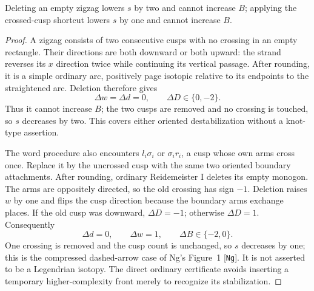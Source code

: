 \begin{lemma}
\label{ng:deletions}\leanok
Deleting an empty zigzag lowers $s$ by two and cannot increase $B$; applying
the crossed-cusp shortcut lowers $s$ by one and cannot increase $B$.

\end{lemma}
\begin{proof}\leanok
A zigzag consists of two consecutive cusps with no crossing in an empty
rectangle. Their directions are both downward or both upward: the
strand reverses its $x$ direction twice while continuing its vertical
passage. After rounding, it is a simple ordinary arc, positively page
isotopic relative to its endpoints to the straightened arc. Deletion
therefore gives
\begin{equation}\label{ng:zigzag-counts}
 \Delta w=\Delta d=0,\qquad \Delta D\in\{0,-2\}.
\end{equation}
Thus it cannot increase $B$; the two cusps are removed and no crossing is
touched, so $s$ decreases by two. This covers either oriented destabilization
without a knot-type assertion.

The word procedure also encounters $l_i\sigma_i$ or $\sigma_i r_i$,
a cusp whose own arms cross once. Replace it by the uncrossed cusp with
the same two oriented boundary attachments. After rounding, ordinary
Reidemeister I deletes its empty monogon. The arms are oppositely
directed, so the old crossing has sign $-1$. Deletion raises $w$ by one
and flips the cusp direction because the boundary arms exchange places.
If the old cusp was downward, $\Delta D=-1$; otherwise $\Delta D=1$.
Consequently
\begin{equation}\label{ng:crossed-cusp-counts}
 \Delta d=0,\qquad \Delta w=1,\qquad \Delta B\in\{-2,0\}.
\end{equation}
One crossing is removed and the cusp count is unchanged, so $s$ decreases
by one; this is the compressed dashed-arrow case of Ng's Figure~1
\textnormal{[\texttt{Ng}]}. It is not asserted to be a Legendrian isotopy. The direct
ordinary certificate avoids inserting a temporary higher-complexity
front merely to recognize its stabilization.
\end{proof}

